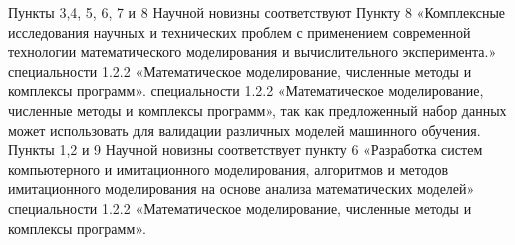 {\appropriation}
Пункты 3,4, 5, 6, 7 и 8 Научной новизны соответствуют Пункту 8 «Комплексные исследования научных и технических проблем с применением современной технологии математического моделирования и
вычислительного эксперимента.» специальности 1.2.2 «Математическое моделирование, численные методы и комплексы программ». специальности 1.2.2 «Математическое моделирование, численные методы и комплексы программ», так как предложенный набор данных может использовать для валидации различных моделей машинного обучения. Пункты 1,2 и 9 Научной новизны соответствует пункту 6 «Разработка систем компьютерного и имитационного моделирования, алгоритмов и методов имитационного моделирования на основе анализа математических моделей» специальности 1.2.2 «Математическое моделирование, численные методы и комплексы программ».

{}
